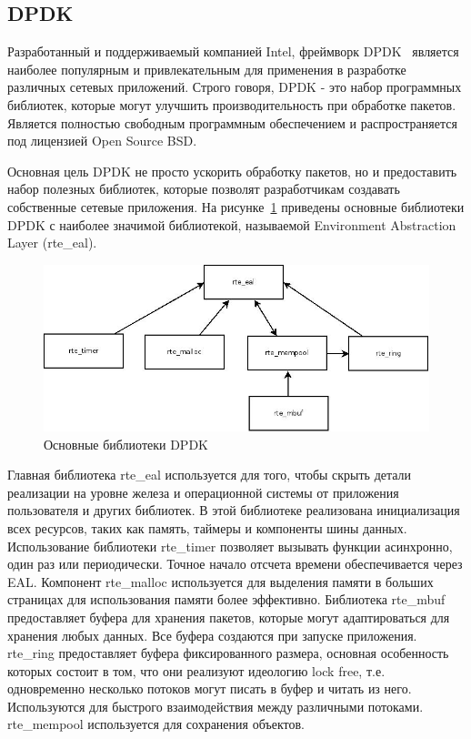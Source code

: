 \subsection{DPDK}
Разработанный и поддерживаемый компанией Intel, фреймворк DPDK~\cite{dpdk_descr} является наиболее популярным и привлекательным для применения в разработке различных сетевых приложений. Строго говоря, DPDK - это набор программных библиотек, которые могут улучшить производительность при обработке пакетов. Является полностью свободным программным обеспечением и распространяется под лицензией Open Source BSD.

Основная цель DPDK не просто ускорить обработку пакетов, но и предоставить набор полезных библиотек, которые позволят разработчикам создавать собственные сетевые приложения. На рисунке~\ref{pic:dpdk_eal} приведены основные библиотеки DPDK с наиболее значимой библиотекой, называемой Environment Abstraction Layer (rte\_eal).
\begin{figure}
\centering
\includegraphics[scale=0.5]{pictures/dpdk_eal}
\caption{Основные библиотеки DPDK}
\label{pic:dpdk_eal}
\end{figure}

Главная библиотека rte\_eal используется для того, чтобы скрыть детали реализации на уровне железа и операционной системы от приложения пользователя и других библиотек. В этой библиотеке реализована инициализация всех ресурсов, таких как память, таймеры и компоненты шины данных. Использование библиотеки rte\_timer позволяет вызывать функции асинхронно, один раз или периодически. Точное начало отсчета времени обеспечивается через EAL. Компонент rte\_malloc используется для выделения памяти в больших страницах для использования памяти более эффективно. Библиотека rte\_mbuf предоставляет буфера для хранения пакетов, которые могут адаптироваться для хранения любых данных. Все буфера создаются при запуске приложения. rte\_ring предоставляет буфера фиксированного размера, основная особенность которых состоит в том, что они реализуют идеологию lock free, т.е. одновременно несколько потоков могут писать в буфер и читать из него. Используются для быстрого взаимодействия между различными потоками. rte\_mempool используется для сохранения объектов.

